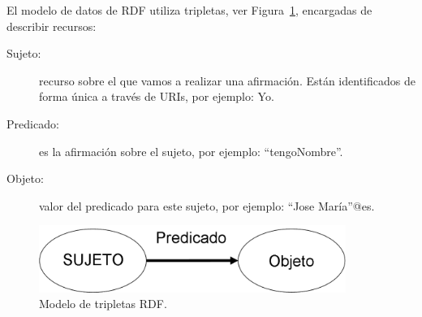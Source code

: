 El modelo de datos de RDF utiliza tripletas, ver Figura~\ref{fig:rdf-model}, encargadas de describir recursos:
\begin{description}
\item[Sujeto:] recurso sobre el que vamos a realizar una afirmación. Están
identificados de forma única a través de URIs, por ejemplo: Yo.
\item[Predicado:] es la afirmación sobre el sujeto, por ejemplo: ``tengoNombre''.
\item[Objeto:] valor del predicado para este sujeto, por ejemplo: ``Jose María''@es.
\end{description}

\begin{figure}[!htbp]
\centering
	\includegraphics[width=10cm]{images/rdf-model}
\caption{Modelo de tripletas RDF.}
\label{fig:rdf-model}
\end{figure}

